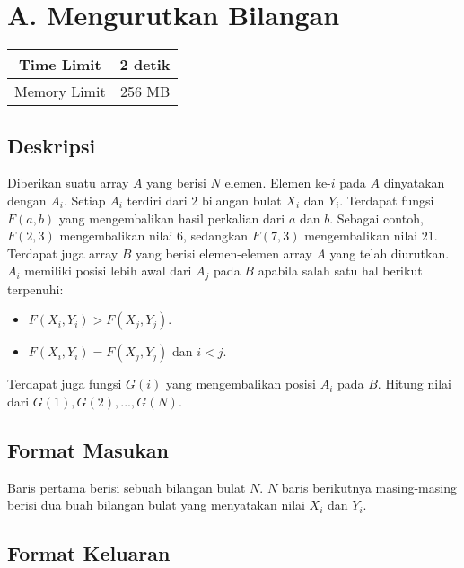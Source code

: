 \documentclass{article}
\begin{document}
\section*{\hfil A. Mengurutkan Bilangan\hfil}

\begin{center}
\begin{tabular}{ |cc| } 
 \hline
 Time Limit & 2 detik \\
 \hline 
 Memory Limit & 256 MB \\
 \hline
\end{tabular}
\end{center}

\subsection*{Deskripsi}

\par\noindent Diberikan suatu array $A$ yang berisi $N$ elemen. Elemen ke-$i$ pada $A$ dinyatakan dengan $A_i$. Setiap $A_i$ terdiri dari $2$ bilangan bulat $X_i$ dan $Y_i$. Terdapat fungsi $F(a,b)$ yang mengembalikan hasil perkalian dari $a$ dan $b$. Sebagai contoh, $F(2,3)$ mengembalikan nilai $6$, sedangkan $F(7,3)$ mengembalikan nilai $21$. Terdapat juga array $B$ yang berisi elemen-elemen array $A$ yang telah diurutkan. $A_i$ memiliki posisi lebih awal dari $A_j$ pada $B$ apabila salah satu hal berikut terpenuhi:

\begin{itemize}
	\item $F(X_i,Y_i) > F(X_j, Y_j)$.
	\item $F(X_i,Y_i) = F(X_j, Y_j)$ dan $i < j$.
\end{itemize}

\par\noindent Terdapat juga fungsi $G(i)$ yang mengembalikan posisi $A_i$ pada $B$. Hitung nilai dari $G(1), G(2), ... , G(N)$. 

\subsection*{Format Masukan}

\par\noindent Baris pertama berisi sebuah bilangan bulat $N$. $N$ baris berikutnya masing-masing berisi dua buah bilangan bulat yang menyatakan nilai $X_i$ dan $Y_i$.

\subsection*{Format Keluaran}
\end{document}
